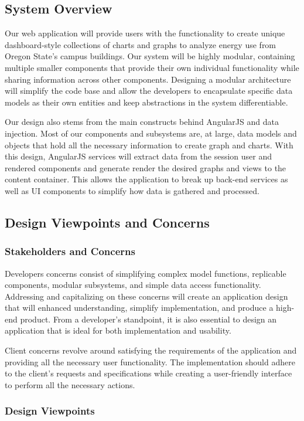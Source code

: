 \subsection{System Overview} 
Our web application will provide users with the functionality to create unique dashboard-style collections of charts and graphs to analyze energy use from Oregon State's campus buildings. Our system will be highly modular, containing multiple smaller components that provide their own individual functionality while sharing information across other components. Designing a modular architecture will simplify the code base and allow the developers to encapsulate specific data models as their own entities and keep abstractions in the system differentiable.

\noindent Our design also stems from the main constructs behind AngularJS and data injection. Most of our components and subsystems are, at large, data models and objects that hold all the necessary information to create graph and charts. With this design, AngularJS services will extract data from the session user and rendered components and generate render the desired graphs and views to the content container. This allows the application to break up back-end services as well as UI components to simplify how data is gathered and processed.
\subsection{Design Viewpoints and Concerns}
\subsubsection{Stakeholders and Concerns}
Developers concerns consist of simplifying complex model functions, replicable components, modular subsystems, and simple data access functionality. Addressing and capitalizing on these concerns will create an application design that will enhanced understanding, simplify implementation, and produce a high-end product. From a developer's standpoint, it is also essential to design an application that is ideal for both implementation and usability.

\noindent Client concerns revolve around satisfying the requirements of the application and providing all the necessary user functionality. The implementation should adhere to the client's requests and specifications while creating a user-friendly interface to perform all the necessary actions.
\subsubsection{Design Viewpoints}
